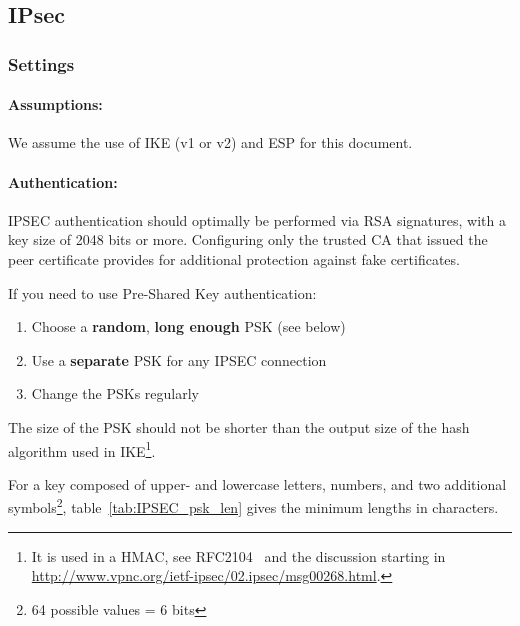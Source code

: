\subsection{IPsec}
\label{section:IPSECgeneral}


\subsubsection{Settings}

\paragraph{Assumptions:}
We assume the use of IKE (v1 or v2) and ESP for this document.

\paragraph{Authentication:}
IPSEC authentication should optimally be performed via RSA signatures,
with a key size of 2048 bits or more. Configuring only the trusted CA
that issued the peer certificate provides for additional protection
against fake certificates.

If you need to use Pre-Shared Key authentication:

\begin{enumerate}
  \item Choose a \textbf{random}, \textbf{long enough} PSK (see below)
  \item Use a \textbf{separate} PSK for any IPSEC connection
  \item Change the PSKs regularly
\end{enumerate}

The size of the PSK should not be shorter than the output size of
the hash algorithm used in IKE\footnote{It is used in a HMAC, see
RFC2104~\cite{rfc2104} and the discussion starting
in \url{http://www.vpnc.org/ietf-ipsec/02.ipsec/msg00268.html}.}.

For a key composed of upper- and lowercase letters, numbers, and two
additional symbols\footnote{64 possible values = 6 bits},
table~\ref{tab:IPSEC_psk_len} gives the minimum lengths in characters.



